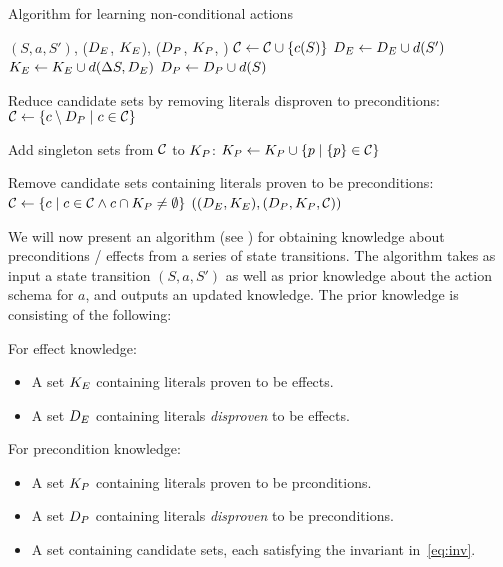 \documentclass[\master/Master.tex]{subfiles}
\begin{document}
\begin{algorithm}
	\caption{Algorithm for learning non-conditional actions}\label{algo:precondLearn}
	\begin{algorithmic}
		 {$\left(S, a, S'\right)$, ($D_E$, $K_E$), ($D_P$, $K_P$, \cset)}
		\State $\mathcal{C} \gets \mathcal{C} \cup \{ c(S) \}$
		\State $D_E \gets D_E \cup d(S')$
		\State $K_E \gets K_E \cup d(\Delta S,D_E)$
		\State $D_P \gets D_P \cup d(S)$
		\EndIf		
		
		\State Reduce candidate sets by removing literals disproven to preconditions:
		\State $\mathcal{C} \gets \left\{ c \setminus D_P \; | \; c \in \mathcal{C} \right\}$
		
		\State Add singleton sets from $\mathcal{C}$ to $K_P$:
		\State $K_P \gets K_P \cup \left\{ p \; | \; \{ p \} \in \mathcal{C} \right\}$
		
		\State Remove candidate sets containing literals proven to be preconditions:
		\State $\mathcal{C} \gets \left\{ c \; | \; c \in \mathcal{C} \land c \cap K_P \neq \emptyset \right\}$
		\State \Return $((D_E, K_E), (D_P, K_P, \mathcal{C}))$
		\EndFunction%
	\end{algorithmic}
\end{algorithm}

We will now present an algorithm (see ) for obtaining knowledge about preconditions / effects from a series of state transitions. 
The algorithm takes as input a state transition $(S, a, S')$ as well as prior knowledge about the action schema for $a$, and outputs an updated knowledge.
The prior knowledge is consisting of the following:

For effect knowledge:
\begin{itemize}
	\item A set $K_E$ containing literals proven to be effects.
	\item A set $D_E$ containing literals \emph{disproven} to be effects.
\end{itemize}

For precondition knowledge:
\begin{itemize}
    \item A set $K_P$ containing literals proven to be prconditions.
	\item A set $D_P$ containing literals \emph{disproven} to be preconditions.
    \item A set \cset containing candidate sets, each satisfying the invariant in~\eqref{eq:inv}.
\end{itemize}
\end{document}
